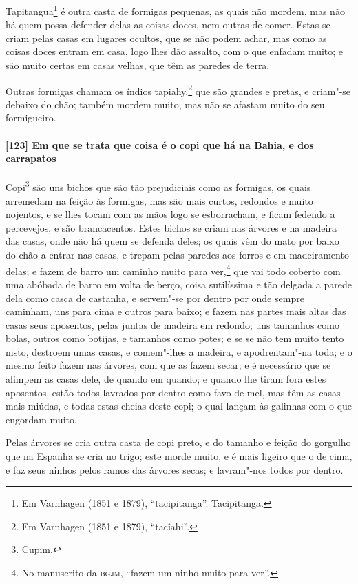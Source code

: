 Tapitangua\footnote{ Em Varnhagen (1851 e 1879), ``tacipitanga''. Tacipitanga.} é outra
casta de formigas pequenas, as quais não mordem, mas não há quem possa defender delas as
coisas doces, nem outras de comer. Estas se criam pelas casas em lugares ocultos, que se
não podem achar, mas como as coisas doces entram em casa, logo lhes dão assalto, com o que
enfadam muito; e são muito certas em casas velhas, que têm as paredes de terra.

Outras formigas chamam os índios tapiahy,\footnote{ Em Varnhagen (1851 e 1879),
``tacîahi''.} que são grandes e pretas, e criam"-se debaixo do chão; também mordem muito,
mas não se afastam muito do seu formigueiro.

\paragraph{[123] Em que se trata que coisa é o copi que há na Bahia, e dos carrapatos}\quad
Copi\footnote{ Cupim.} são uns bichos que são tão prejudiciais como as formigas, os quais
arremedam na feição às formigas, mas são mais curtos, redondos e muito nojentos, e se lhes
tocam com as mãos logo se esborracham, e ficam fedendo a percevejos, e são brancacentos.
Estes bichos se criam nas árvores e na madeira das casas, onde não há quem se defenda
deles; os quais vêm do mato por baixo do chão a entrar nas casas, e trepam pelas paredes
aos forros e em madeiramento delas; e fazem de barro um caminho muito para ver,\footnote{
No manuscrito da \textsc{bgjm}, ``fazem um ninho muito para ver''.} que vai todo coberto
com uma abóbada de barro em volta de berço, coisa sutilíssima e tão delgada a parede dela
como casca de castanha, e servem"-se por dentro por onde sempre caminham, uns para cima e
outros para baixo; e fazem nas partes mais altas das casas seus aposentos, pelas juntas de
madeira em redondo; uns tamanhos como bolas, outros como botijas, e tamanhos como potes; e
se se não tem muito tento nisto, destroem umas casas, e comem"-lhes a madeira, e
apodrentam"-na toda; e o mesmo feito fazem nas árvores, com que as fazem secar; e é
necessário que se alimpem as casas dele, de quando em quando; e quando lhe tiram fora
estes aposentos, estão todos lavrados por dentro como favo de mel, mas têm as casas mais
miúdas, e todas estas cheias deste copi; o qual lançam às galinhas com o que engordam
muito.

Pelas árvores se cria outra casta de copi preto, e do tamanho e feição do gorgulho que na
Espanha se cria no trigo; este morde muito, e é mais ligeiro que o de cima, e faz seus
ninhos pelos ramos das árvores secas; e lavram"-nos todos por dentro.

